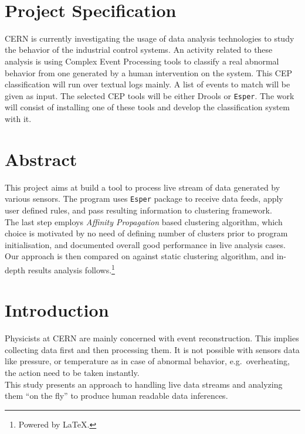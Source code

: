 \documentclass[11pt, letterpaper]{article}            %
\newcommand{\footrulecolor}[1]{\patchcmd{\footrule}{\hrule}{\color{#1}\hrule}{}{}} %
\begin{document}
~
\thispagestyle{empty}\newpage

\section*{Project Specification}
CERN is currently investigating the usage of data analysis technologies to study the behavior of the industrial control systems. An activity related to these analysis is using Complex Event Processing tools to classify a real abnormal behavior from one generated by a human intervention on the system. This CEP classification will run over textual logs mainly. A list of events to match will be given as input. The selected CEP tools will be either Drools or \texttt{Esper}. The work will consist of installing one of these tools and develop the classification system with it.
\newpage

\section*{Abstract}
This project aims at build a tool to process live stream of data generated by various sensors. The program uses \texttt{Esper} package to receive data feeds, apply user defined rules, and pass resulting information to clustering framework.\\
The last step employs \emph{Affinity Propagation} based clustering algorithm, which choice is motivated by no need of defining number of clusters prior to program initialisation, and documented overall good performance in live analysis cases.\\
Our approach is then compared on against static clustering algorithm, and in-depth results analysis follows.\let\thefootnote\relax\footnote{\noindent Powered by \LaTeX.}\\
\newpage

{\fontsize{11}{13}\sffamily\linespread{1.750}\selectfont\tableofcontents}
\thispagestyle{fancy}\newpage

\fancyfoot{} %
\renewcommand{\footrulewidth}{0.4pt} %
\footrulecolor{linec}

\section{Introduction}
Physicists at CERN are mainly concerned with event reconstruction. This implies collecting data first and then processing them. It is not possible with sensors data like pressure, or temperature as in case of abnormal behavior, e.g.\ overheating, the action need to be taken instantly.\\
This study presents an approach to handling live data streams and analyzing them ``on the fly'' to produce human readable data inferences.\\
\end{document}
